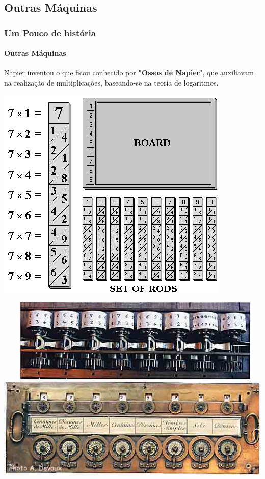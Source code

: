 \documentclass[12pt,a4paper,final]{beamer}
\begin{document}
        \subsection{Outras Máquinas}
            \begin{frame}
                \frametitle{Um Pouco de história}
                \framesubtitle{Outras Máquinas}
                \begin{minipage}{.6\linewidth}
                    Napier inventou o que ficou conhecido por \textbf{"Ossos de Napier}", que auxiliavam na realização de multiplicações, baseando-se na teoria de logaritmos.    
                \end{minipage}
                \begin{minipage}{.3\linewidth}
                    \includegraphics[scale=0.2]{Imagens/napier.jpg}
                \end{minipage}
                \begin{minipage}{.3\linewidth}
                    \includegraphics[scale=0.15]{Imagens/pascaline.jpg}

\end{minipage}
\end{frame}
\end{document}
